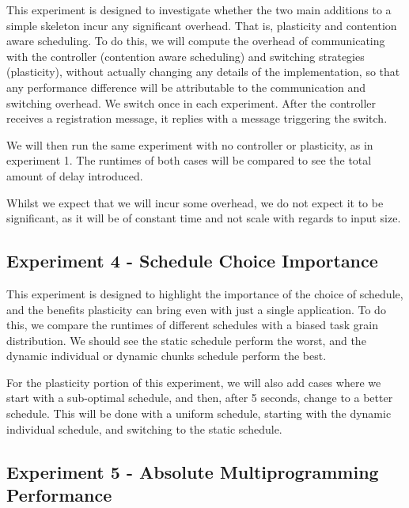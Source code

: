 This experiment is designed to investigate whether the two main additions to a simple skeleton incur any significant overhead. That is, plasticity and contention aware scheduling. To do this, we will compute the overhead of communicating with the controller (contention aware scheduling) and switching strategies (plasticity), without actually changing any details of the implementation, so that any performance difference will be attributable to the communication and switching overhead. We switch once in each experiment. After the controller receives a registration message, it replies with a message triggering the switch.

We will then run the same experiment with no controller or plasticity, as in experiment 1. The runtimes of both cases will be compared to see the total amount of delay introduced.

Whilst we expect that we will incur some overhead, we do not expect it to be significant, as it will be of constant time and not scale with regards to input size.





\subsection{Experiment 4 - Schedule Choice Importance}

This experiment is designed to highlight the importance of the choice of schedule, and the benefits plasticity can bring even with just a single application. To do this, we compare the runtimes of different schedules with a biased task grain distribution. We should see the static schedule perform the worst, and the dynamic individual or dynamic chunks schedule perform the best.

For the plasticity portion of this experiment, we will also add cases where we start with a sub-optimal schedule, and then, after 5 seconds, change to a better schedule. This will be done with a uniform schedule, starting with the dynamic individual schedule, and switching to the static schedule.





\subsection{Experiment 5 - Absolute Multiprogramming Performance}

